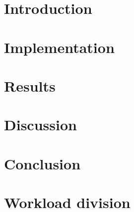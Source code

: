 \documentclass[twoside]{article}
\begin{document}
\begin{multicols}{2} %
\section{Introduction}
\label{sec:intro}


\section{Implementation}
\label{sec:implementation}


\section{Results}
\label{sec:results}


\section{Discussion}
\label{sec:discussion}


\section{Conclusion}
\label{sec:conclusion}


\section{Workload division}

\label{sec:workload}





\end{multicols}
\end{document}

